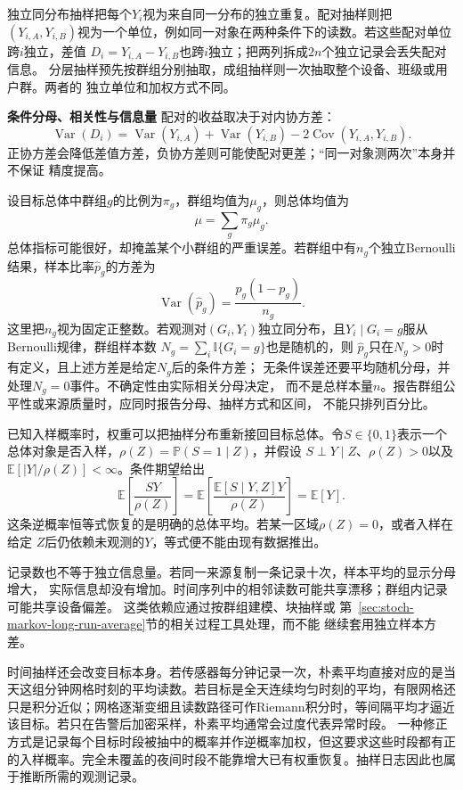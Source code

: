 独立同分布抽样把每个\(Y_i\)视为来自同一分布的独立重复。配对抽样则把
\((Y_{i,A},Y_{i,B})\)视为一个单位，例如同一对象在两种条件下的读数。若这些配对单位跨\(i\)独立，差值
\(D_i=Y_{i,A}-Y_{i,B}\)也跨\(i\)独立；把两列拆成\(2n\)个独立记录会丢失配对信息。
分层抽样预先按群组分别抽取，成组抽样则一次抽取整个设备、班级或用户群。两者的
独立单位和加权方式不同。

\par\medskip\noindent\textbf{条件分母、相关性与信息量}\quad
配对的收益取决于对内协方差：
\[
  \operatorname{Var}(D_i)
  =\operatorname{Var}(Y_{i,A})+\operatorname{Var}(Y_{i,B})
   -2\operatorname{Cov}(Y_{i,A},Y_{i,B}).
\]
正协方差会降低差值方差，负协方差则可能使配对更差；“同一对象测两次”本身并不保证
精度提高。

设目标总体中群组\(g\)的比例为\(\pi_g\)，群组均值为\(\mu_g\)，则总体均值为
\[
  \mu=\sum_g\pi_g\mu_g.
\]
总体指标可能很好，却掩盖某个小群组的严重误差。若群组中有\(n_g\)个独立Bernoulli
结果，样本比率\(\widehat p_g\)的方差为
\[
  \operatorname{Var}(\widehat p_g)
  =\frac{p_g(1-p_g)}{n_g}.
\]
这里把\(n_g\)视为固定正整数。若观测对\((G_i,Y_i)\)独立同分布，且\(Y_i\mid G_i=g\)服从Bernoulli规律，群组样本数
\(N_g=\sum_i\mathbb{I}\{G_i=g\}\)也是随机的，则
\(\widehat p_g\)只在\(N_g>0\)时有定义，且上述方差是给定\(N_g\)后的条件方差；
无条件误差还要平均随机分母，并处理\(N_g=0\)事件。不确定性由实际相关分母决定，
而不是总样本量\(n\)。报告群组公平性或来源质量时，应同时报告分母、抽样方式和区间，
不能只排列百分比。

已知入样概率时，权重可以把抽样分布重新接回目标总体。令\(S\in\{0,1\}\)表示一个
总体对象是否入样，\(\rho(Z)=\mathbb{P}(S=1\mid Z)\)，并假设
\(S\mathrel{\perp}Y\mid Z\)、\(\rho(Z)>0\)以及
\(\mathbb{E}[|Y|/\rho(Z)]<\infty\)。条件期望给出
\[
  \mathbb{E}\left[\frac{SY}{\rho(Z)}\right]
  =\mathbb{E}\left[
    \frac{\mathbb{E}[S\mid Y,Z]Y}{\rho(Z)}
  \right]
  =\mathbb{E}[Y].
\]
这条逆概率恒等式恢复的是明确的总体平均。若某一区域\(\rho(Z)=0\)，或者入样在给定
\(Z\)后仍依赖未观测的\(Y\)，等式便不能由现有数据推出。

记录数也不等于独立信息量。若同一来源复制一条记录十次，样本平均的显示分母增大，
实际信息却没有增加。时间序列中的相邻读数可能共享漂移；群组内记录可能共享设备偏差。
这类依赖应通过按群组建模、块抽样或
第~\ref{sec:stoch-markov-long-run-average}节的相关过程工具处理，而不能
继续套用独立样本方差。

时间抽样还会改变目标本身。若传感器每分钟记录一次，朴素平均直接对应的是当天这组分钟网格时刻的平均读数。若目标是全天连续均匀时刻的平均，有限网格还只是积分近似；网格逐渐变细且读数路径可作Riemann积分时，等间隔平均才逼近该目标。若只在告警后加密采样，朴素平均通常会过度代表异常时段。
一种修正方式是记录每个目标时段被抽中的概率并作逆概率加权，但这要求这些时段都有正的入样概率。完全未覆盖的夜间时段不能靠增大已有权重恢复。抽样日志因此也属于推断所需的观测记录。

